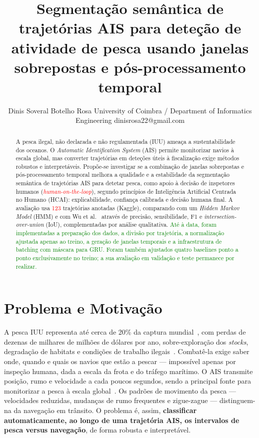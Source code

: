 \documentclass{article}
\title{Segmenta\c{c}\~ao sem\^antica de trajet\'orias AIS para dete\c{c}\~ao de atividade de pesca usando janelas sobrepostas e p\'os-processamento temporal}
\author{
    Dinis Soveral Botelho Rosa
    \affiliations
    University of Coimbra / Department of Informatics Engineering
    \emails
    dinisrosa22@gmail.com
}
\begin{document}
\maketitle

\begin{abstract}
A pesca ilegal, não declarada e não regulamentada (IUU) ameaça a sustentabilidade dos oceanos. O \emph{Automatic Identification System} (AIS) permite monitorizar navios à escala global, mas converter trajetórias em deteções úteis à fiscalização exige métodos robustos e interpretáveis. Propõe-se investigar se a combinação de janelas sobrepostas e pós-processamento temporal melhora a qualidade e a estabilidade da segmentação semântica de trajetórias AIS para detetar pesca, como apoio à decisão de inspetores humanos (\textcolor{red}{\emph{human-on-the-loop}}), segundo princípios de Inteligência Artificial Centrada no Humano (HCAI): explicabilidade, confiança calibrada e decisão humana final. A avaliação usa \textcolor{red}{123} trajetórias anotadas (Kaggle), comparando com um \emph{Hidden Markov Model} (HMM) e com Wu et al.~ através de precisão, sensibilidade, F1 e \emph{intersection-over-union} (IoU), complementadas por análise qualitativa.
\textcolor{green}{Até à data, foram implementadas a preparação dos dados, a divisão por trajetória, a normalização ajustada apenas ao treino, a geração de janelas temporais e a infraestrutura de batching com máscara para GRU. Foram também ajustados quatro baselines ponto a ponto exclusivamente no treino; a sua avaliação em validação e teste permanece por realizar.}
\end{abstract}

\section{Problema e Motivação}
\label{sec:problema-motivacao}

A pesca IUU representa até cerca de 20\% da captura mundial~\cite{agnew2009}, com perdas de dezenas de milhares de milhões de dólares por ano, sobre-exploração dos \emph{stocks}, degradação de habitats e condições de trabalho ilegais~\cite{chuaysi2020}. Combatê-la exige saber onde, quando e quais os navios que estão a pescar --- impossível apenas por inspeção humana, dada a escala da frota e do tráfego marítimo. O AIS transmite posição, rumo e velocidade a cada poucos segundos, sendo a principal fonte para monitorizar a pesca à escala global~\cite{natale2015,kroodsma2018}. Os padrões de movimento da pesca --- velocidades reduzidas, mudanças de rumo frequentes e zigue-zague --- distinguem-na da navegação em trânsito. O problema é, assim, \textbf{classificar automaticamente, ao longo de uma trajetória AIS, os intervalos de pesca versus navegação}, de forma robusta e interpretável.
\end{document}
